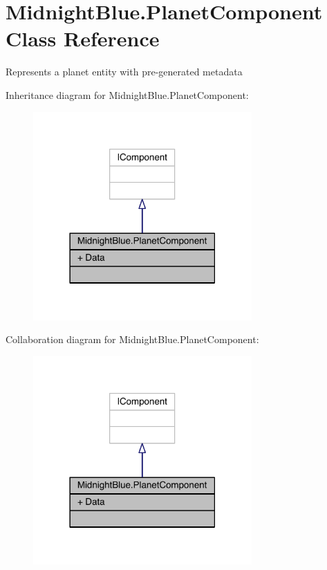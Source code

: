 \hypertarget{class_midnight_blue_1_1_planet_component}{}\section{Midnight\+Blue.\+Planet\+Component Class Reference}
\label{class_midnight_blue_1_1_planet_component}


Represents a planet entity with pre-\/generated metadata  




Inheritance diagram for Midnight\+Blue.\+Planet\+Component\+:
\nopagebreak
\begin{figure}[H]
\begin{center}
\leavevmode
\includegraphics[width=237pt]{class_midnight_blue_1_1_planet_component__inherit__graph}
\end{center}
\end{figure}


Collaboration diagram for Midnight\+Blue.\+Planet\+Component\+:
\nopagebreak
\begin{figure}[H]
\begin{center}
\leavevmode
\includegraphics[width=237pt]{class_midnight_blue_1_1_planet_component__coll__graph}
\end{center}
\end{figure}
